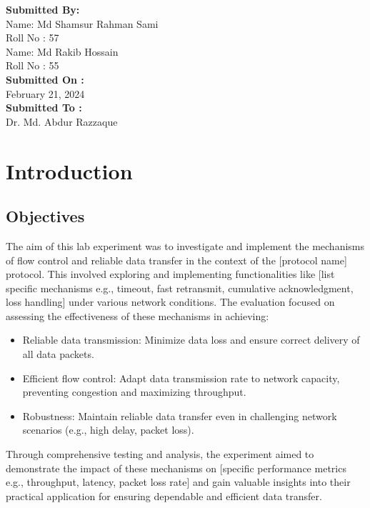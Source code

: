\documentclass[11pt]{article}
\begin{document}
\begin{titlepage}
\begin{large}
        \textbf{Submitted By:\\[12pt]}
            Name: Md Shamsur Rahman Sami\\[5pt]
            Roll No : 57\\[7pt]
            Name: Md Rakib Hossain\\[5pt]
            Roll No : 55\\[12pt]
        \textbf{Submitted On : \\[12pt]}
            February 21, 2024\\[20pt]
        \textbf{Submitted To :\\[12pt]}
            Dr. Md. Abdur Razzaque\\[12pt]
    \end{large}
\end{titlepage}

\tableofcontents  

\newpage

\section{Introduction}
\subsection{Objectives}

The aim of this lab experiment was to investigate and implement the mechanisms of flow control and reliable data transfer in the context of the [protocol name] protocol. This involved exploring and implementing functionalities like [list specific mechanisms e.g., timeout, fast retransmit, cumulative acknowledgment, loss handling] under various network conditions. The evaluation focused on assessing the effectiveness of these mechanisms in achieving:

\begin{itemize}
    \item Reliable data transmission: Minimize data loss and ensure correct delivery of all data packets.
    \item Efficient flow control: Adapt data transmission rate to network capacity, preventing congestion and maximizing throughput.
    \item Robustness: Maintain reliable data transfer even in challenging network scenarios (e.g., high delay, packet loss).
\end{itemize}

Through comprehensive testing and analysis, the experiment aimed to demonstrate the impact of these mechanisms on [specific performance metrics e.g., throughput, latency, packet loss rate] and gain valuable insights into their practical application for ensuring dependable and efficient data transfer.
\end{document}

